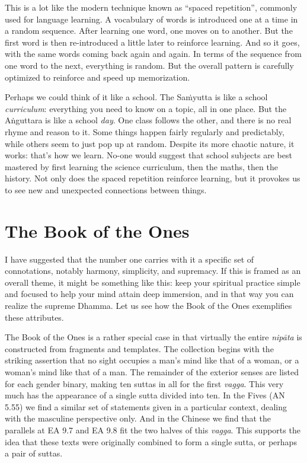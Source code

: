 \documentclass[12pt,openany]{book}%
\begin{document}
This is a lot like the modern technique known as “spaced repetition”, commonly used for language learning. A vocabulary of words is introduced one at a time in a random sequence. After learning one word, one moves on to another. But the first word is then re-introduced a little later to reinforce learning. And so it goes, with the same words coming back again and again. In terms of the sequence from one word to the next, everything is random. But the overall pattern is carefully optimized to reinforce and speed up memorization.

Perhaps we could think of it like a school. The \textsanskrit{Saṁyutta} is like a school \emph{curriculum}: everything you need to know on a topic, all in one place. But the \textsanskrit{Aṅguttara} is like a school \emph{day}. One class follows the other, and there is no real rhyme and reason to it. Some things happen fairly regularly and predictably, while others seem to just pop up at random. Despite its more chaotic nature, it works: that’s how we learn. No-one would suggest that school subjects are best mastered by first learning the science curriculum, then the maths, then the history. Not only does the spaced repetition reinforce learning, but it provokes us to see new and unexpected connections between things.

\section*{The Book of the Ones}

I have suggested that the number one carries with it a specific set of connotations, notably harmony, simplicity, and supremacy. If this is framed as an overall theme, it might be something like this: keep your spiritual practice simple and focused to help your mind attain deep immersion, and in that way you can realize the supreme Dhamma. Let us see how the Book of the Ones exemplifies these attributes.

The Book of the Ones is a rather special case in that virtually the entire \textit{\textsanskrit{nipāta}} is constructed from fragments and templates. The collection begins with the striking assertion that no sight occupies a man’s mind like that of a woman, or a woman’s mind like that of a man. The remainder of the exterior senses are listed for each gender binary, making ten suttas in all for the first \textit{vagga}. This very much has the appearance of a single sutta divided into ten. In the Fives (AN 5.55) we find a similar set of statements given in a particular context, dealing with the masculine perspective only. And in the Chinese we find that the parallels at EA 9.7 and EA 9.8 fit the two halves of this \textit{vagga}. This supports the idea that these texts were originally combined to form a single sutta, or perhaps a pair of suttas.
\end{document}

